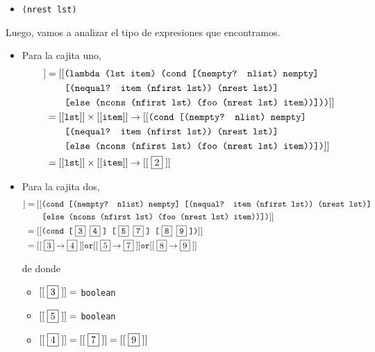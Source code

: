 \documentclass[letterpaper,11pt]{article}
\begin{document}
\begin{enumerate}
\begin{itemize}
        \item {} \texttt{(nrest lst)}
    \end{itemize}

    Luego, vamos a analizar el tipo de expresiones que encontramos.
    \begin{itemize}
        \item Para la cajita uno,
        \begin{align*}
            [[\;\fbox{1}\;]]
            &= [[\texttt{(lambda (lst item) (cond [(nempty? nlist) nempty]} \\ 
            &\; \; \; \; \; \; \; \texttt{[(nequal? item (nfirst lst)) 
            (nrest lst)]} \\
            &\; \; \; \; \; \; \; \texttt{[else (ncons (nfirst lst) 
            (foo (nrest lst) item))]))}]] \\ 
            &= [[\texttt{lst}]] \times [[\texttt{item}]] \rightarrow 
            [[\texttt{(cond [(nempty? nlist) nempty]} \\ 
            &\; \; \; \; \; \; \; \texttt{[(nequal? item (nfirst lst)) 
            (nrest lst)]} \\
            &\; \; \; \; \; \; \; \texttt{[else (ncons (nfirst lst) 
            (foo (nrest lst) item))])}]] \\ 
            &= [[\texttt{lst}]] \times [[\texttt{item}]] \rightarrow [[\;\fbox{2}\;]]
        \end{align*}
   
        \item Para la cajita dos, 
        \begin{align*}
            [[\;\fbox{2}\;]] 
            &= [[\texttt{(cond [(nempty? nlist) nempty] [(nequal? item 
            (nfirst lst)) (nrest lst)]} \\ 
            &\; \; \; \; \; \; \; \texttt{[else (ncons (nfirst lst) 
            (foo (nrest lst) item))])}]] \\ 
            &= [[\texttt{(cond [\;\fbox{3} \fbox{4}\;] [\;\fbox{5} \fbox{7}\;] 
            [\;\fbox{8} \fbox{9}\;])}]] \\
            &= [[\;\fbox{3} \rightarrow \fbox{4}\;]] \texttt{or} 
            [[\;\fbox{5} \rightarrow \fbox{7}\;]] \texttt{or}
            [[\;\fbox{8} \rightarrow \fbox{9}\;]]
        \end{align*}

        de donde 
        \begin{itemize}
            \item $[[\;\fbox{3}\;]] =$ \texttt{boolean}
            \item $[[\;\fbox{5}\;]] =$ \texttt{boolean}
            \item $[[\;\fbox{4}\;]] = [[\;\fbox{7}\;]] = [[\;\fbox{9}\;]]$
        \end{itemize}


\end{itemize}
\end{enumerate}
\end{document}
